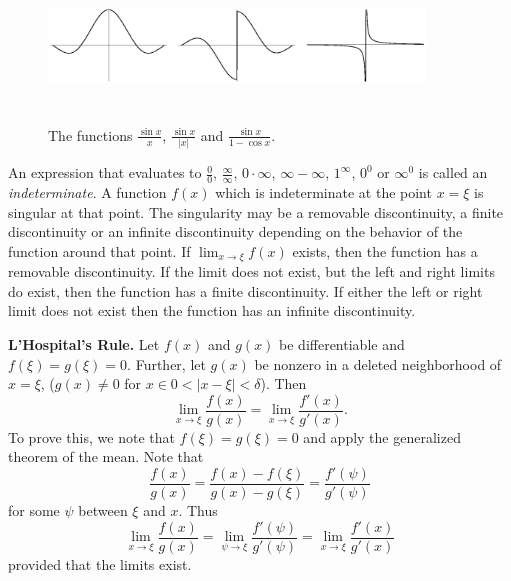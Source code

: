 \begin{figure}[h!]
\begin{minipage}{\textwidth}
\begin{center}
\includegraphics[height=4cm,width=10cm]{disc3.eps}
\end{center}
\end{minipage}
\caption{The functions $\frac{\sin x}{x}$, $\frac{\sin x}{|x|}$ and
    $\frac{\sin x}{1 - \cos x}$.}
\label{fig:disc3}
\label{disc3}
\end{figure}

An expression that evaluates to $\frac{0}{0}$, $\frac{\infty}{\infty}$,
$0 \cdot \infty$, $\infty - \infty$, $1^\infty$, $0^0$ or $\infty^0$
is called an \textit{indeterminate}.  A function $f(x)$ which is indeterminate
at the point $x = \xi$ is singular at that point.  The singularity may be a 
removable discontinuity, a finite discontinuity or an infinite discontinuity
depending on the behavior of the function around that point.  If
$\lim_{x \to \xi} f(x)$ exists, then the function has a removable 
discontinuity.  If the limit does not exist, but the left and right limits 
do exist, then the function has a finite discontinuity.  If either the
left or right limit does not exist then the function has an infinite
discontinuity.





{\bf L'Hospital's Rule.}
Let $f(x)$ and $g(x)$ be differentiable and $f(\xi) = g(\xi) = 0$.  
Further, let $g(x)$ be nonzero in a deleted neighborhood of $x= \xi$, 
($g(x) \neq 0$ for $x \in 0 < |x - \xi| < \delta$).  Then
\[
\lim_{x \to \xi} \frac{f(x)}{g(x)} = \lim_{x \to \xi} \frac{f'(x)}{g'(x)}.
\]
To prove this, we note that $f(\xi) = g(\xi) = 0$ and apply the generalized
theorem of the mean.  Note that
\[
\frac{f(x)}{g(x)} = \frac{f(x) - f(\xi)}{g(x) - g(\xi)}
= \frac{f'(\psi)}{g'(\psi)}
\]
for some $\psi$ between $\xi$ and $x$.  Thus
\[
\lim_{x \to \xi} \frac{f(x)}{g(x)} 
= \lim_{\psi \to \xi} \frac{f'(\psi)}{g'(\psi)}
= \lim_{x \to \xi} \frac{f'(x)}{g'(x)}
\]
provided that the limits exist.


